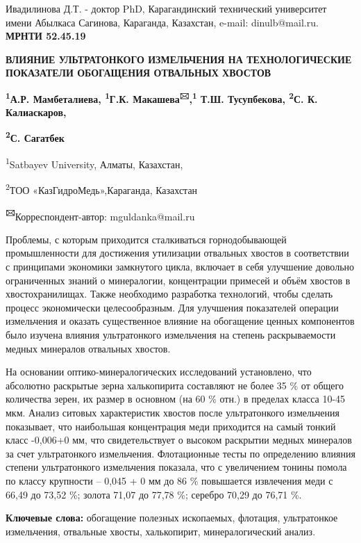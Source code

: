 Ивадилинова Д.Т. - доктор PhD, Карагандинский технический университет
имени Абылкаса Сагинова, Караганда, Казахстан, e-mail: dinulb@mail.ru.\newpage
{\bfseries МРНТИ 52.45.19}

{\bfseries ВЛИЯНИЕ УЛЬТРАТОНКОГО ИЗМЕЛЬЧЕНИЯ НА ТЕХНОЛОГИЧЕСКИЕ ПОКАЗАТЕЛИ
ОБОГАЩЕНИЯ ОТВАЛЬНЫХ ХВОСТОВ}

{\bfseries \textsuperscript{1}А.Р. Мамбеталиева, \textsuperscript{1}Г.К.
Макашева\textsuperscript{🖂},\textsuperscript{1} Т.Ш. Тусупбекова,
\textsuperscript{2}С. К. Калиаскаров,}

{\bfseries \textsuperscript{2}С. Сагатбек}

\textsuperscript{1}Satbayev University, Алматы, Казахстан,

\textsuperscript{2}ТОО «КазГидроМедь»,Караганда, Казахстан

{\bfseries \textsuperscript{🖂}}Корреспондент-автор: mguldanka@mail.ru

Проблемы, с которым приходится сталкиваться горнодобывающей
промышленности для достижения утилизации отвальных хвостов в
соответствии с принципами экономики замкнутого цикла, включает в себя
улучшение довольно ограниченных знаний о минералогии, концентрации
примесей и объём хвостов в хвостохранилищах. Также необходимо разработка
технологий, чтобы сделать процесс экономически целесообразным. Для
улучшения показателей операции измельчения и оказать существенное
влияние на обогащение ценных компонентов было изучена влияния
ультратонкого измельчения на степень раскрываемости медных минералов
отвальных хвостов.

На основании оптико-минералогических исследований установлено, что
абсолютно раскрытые зерна халькопирита составляют не более 35 \% от
общего количества зерен, их размер в основном (на 60 \% отн.) в пределах
класса 10-45 мкм. Анализ ситовых характеристик хвостов после
ультратонкого измельчения показывает, что наибольшая концентрация меди
приходится на самый тонкий класс -0,006+0 мм, что свидетельствует о
высоком раскрытии медных минералов за счет ультратонкого измельчения.
Флотационные тесты по определению влияния степени ультратонкого
измельчения показала, что с увеличением тонины помола по классу
крупности -- 0,045 + 0 мм до 86 \% повышается извлечения меди с 66,49 до
73,52 \%; золота 71,07 до 77,78 \%; серебро 70,29 до 76,71 \%.

{\bfseries Ключевые слова:} обогащение полезных ископаемых, флотация,
ультратонкое измельчения, отвальные хвосты, халькопирит,
минералогический анализ.

